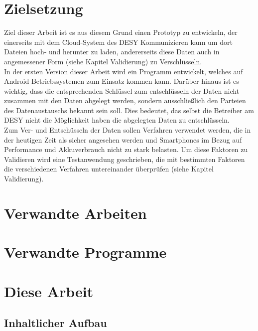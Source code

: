 \documentclass[10pt, a4paper]{scrreprt}
\begin{document}
\section{Zielsetzung}
Ziel dieser Arbeit ist es aus diesem Grund einen Prototyp zu entwickeln, der einerseits mit dem Cloud-System des DESY Kommunizieren kann um dort Dateien hoch- und herunter zu laden, andererseits diese Daten auch in angemessener Form (siehe Kapitel Validierung) zu Verschlüsseln. \\
In der ersten Version dieser Arbeit wird ein Programm entwickelt, welches auf Android-Betriebssystemen zum Einsatz kommen kann. Darüber hinaus ist es wichtig, dass die entsprechenden Schlüssel zum entschlüsseln der Daten nicht zusammen mit den Daten abgelegt werden, sondern ausschließlich den Parteien des Datenaustauschs bekannt sein soll. Dies bedeutet, das selbst die Betreiber am DESY nicht die Möglichkeit haben die abgelegten Daten zu entschlüsseln. \\
Zum Ver- und Entschüsseln der Daten sollen Verfahren verwendet werden, die in der heutigen Zeit als sicher angesehen werden und Smartphones im Bezug auf Performance und Akkuverbrauch nicht zu stark belasten. Um diese Faktoren zu Validieren wird eine Testanwendung geschrieben, die mit bestimmten Faktoren die verschiedenen Verfahren untereinander überprüfen (siehe Kapitel Validierung).

\section{Verwandte Arbeiten}
\section{Verwandte Programme}


\section{Diese Arbeit}
\subsection{Inhaltlicher Aufbau}
\end{document}
